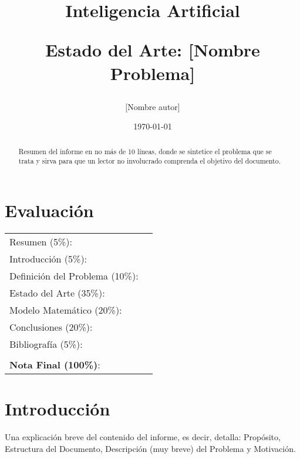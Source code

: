 \documentclass[letter, 10pt]{article}
\begin{document}
\title{Inteligencia Artificial \\ \begin{Large}Estado del Arte: [Nombre Problema]\end{Large}}
\author{[Nombre autor]}
\date{\today}
\maketitle


\section*{Evaluaci\'on}

\begin{tabular}{ll}
Resumen (5\%): & \underline{\hspace{2cm}} \\
Introducci\'on (5\%):  & \underline{\hspace{2cm}} \\
Definici\'on del Problema (10\%):  & \underline{\hspace{2cm}} \\
Estado del Arte (35\%):  & \underline{\hspace{2cm}} \\
Modelo Matem\'atico (20\%): &  \underline{\hspace{2cm}}\\
Conclusiones (20\%): &  \underline{\hspace{2cm}}\\
Bibliograf\'ia (5\%): & \underline{\hspace{2cm}}\\
 &  \\
\textbf{Nota Final (100\%)}:   & \underline{\hspace{2cm}}
\end{tabular}
\vspace{2cm}


\begin{abstract}
Resumen del informe en no m\'as de 10 l\'ineas, donde se sintetice el problema que se trata y sirva para que un lector no involucrado comprenda el objetivo del documento.
\end{abstract}

\section{Introducci\'on}
Una explicaci\'on breve del contenido del informe, es decir, detalla: Prop\'osito, Estructura del Documento, Descripci\'on (muy breve) del Problema y Motivaci\'on.
\end{document}
